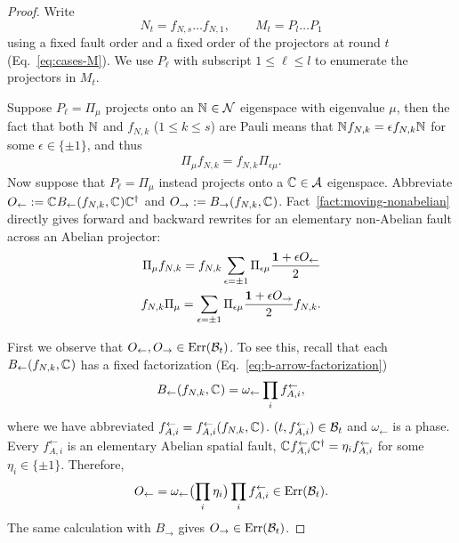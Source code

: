\documentclass[11pt]{article}
\begin{document}
\begin{proof}
    Write
    \[
    N_t = f_{N,s}\dots f_{N,1},\qquad M_t =P_{l}\dots P_1
    \]
    using a fixed fault order and a fixed order of the projectors at round $t$ (Eq.~\eqref{eq:cases-M}). We use $P_\ell$ with subscript $1\le \ell \le l$ to enumerate the projectors in $M_t$.
    
    Suppose $P_\ell=\Pi_{\mu}$ projects onto an 
    $\mathbb{N}_{}\in \mathcal{N}$ eigenspace with eigenvalue $\mu$, 
    then the fact that both $\mathbb{N}_{}$ and $f_{N,k}$ ($1\le k\le s$) are Pauli means that $\mathbb{N}_{}f_{N,k}=\epsilon f_{N,k}\mathbb{N}_{}$ for some $\epsilon\in \{\pm 1\}$,
    and thus
    \begin{align}
    \label{eq:move-non-abelian-projector}
        \Pi_{\mu} f_{N,k} = f_{N,k}\Pi_{\epsilon \mu}.
    \end{align}
    Now suppose that $P_\ell=\Pi_{\mu}$ instead projects onto a $\mathbb{C}_{}\in \mathcal{A}$ eigenspace. Abbreviate $O_\leftarrow:= \mathbb{C}_{}B_\leftarrow(f_{N,k},\mathbb{C}_{}) \mathbb{C}_{}^\dagger$ and $O_\rightarrow:=B_\rightarrow (f_{N,k},\mathbb{C}_{})$.
    Fact~\ref{fact:moving-nonabelian} directly gives forward and backward rewrites for an elementary non-Abelian fault across an Abelian projector: 
    \begin{align}
        \Pi_{\mu}f_{N,k} = f_{N,k}\sum_{\epsilon=\pm1} \Pi_{\epsilon \mu} 
        \frac{\mathbf{1} + \epsilon O_\leftarrow}{2}
        \label{eq:forward-elementary-non-abelian}\\
        f_{N,k}\Pi_{\mu}=
        \sum_{\epsilon=\pm1}
        \Pi_{\epsilon \mu}
        \frac{\mathbf{1} + \epsilon O_\rightarrow}{2}f_{N,k}.
        \label{eq:backward-elementary-non-abelian}
    \end{align}

    First we observe that $O_\leftarrow,O_\rightarrow\in\mathrm{Err}(\mathcal{B}_t)$. To see this, recall that each $B_\leftarrow (f_{N,k},\mathbb{C}_{})$ has a fixed factorization (Eq.~\eqref{eq:b-arrow-factorization})
    \[
    B_\leftarrow (f_{N,k},\mathbb{C}_{}) = \omega_{\leftarrow}\prod_if_{A,i}^{\leftarrow},
    \]
    where we have abbreviated $f_{A,i}^\leftarrow = f_{A,i}^\leftarrow(f_{N,k},\mathbb{C}_{})$.
    $(t,f_{A,i}^\leftarrow)\in \mathcal{B}_t$ and $\omega_\leftarrow$ is a phase. 
    Every $f_{A,i}^\leftarrow$ is an elementary Abelian spatial fault, $\mathbb{C}_{}f_{A,i}^{\leftarrow} \mathbb{C}_{}^{\dagger}=\eta_i f_{A,i}^{\leftarrow}$ for some $\eta_i\in \{\pm 1\}$.
    Therefore,
    \[
    O_\leftarrow = \omega_\leftarrow \bigl(\prod_{i}\eta_i \bigr) \prod_i f_{A,i}^\leftarrow \in \mathrm{Err}(\mathcal{B}_t).
    \]
    The same calculation with $B_\rightarrow$ gives $O_\rightarrow\in \mathrm{Err}(\mathcal{B}_t)$.


\end{proof}
\end{document}
